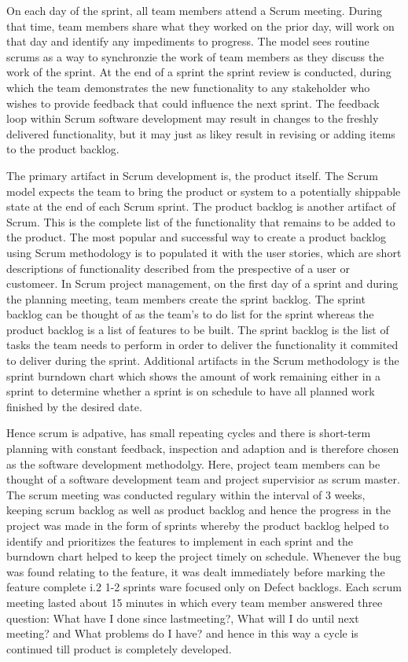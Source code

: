 On each day of the sprint, all team members attend a Scrum meeting. During that time, team members share what they worked on the prior day, will work on that day and identify any impediments to progress. The model sees routine scrums as a way to synchronzie the work of team members as they discuss the work of the sprint. At the end of a sprint the sprint review is conducted, during which the team demonstrates the new functionality to any stakeholder who wishes to provide feedback that could influence the next sprint. The feedback loop within Scrum software development may result in changes to the freshly delivered functionality, but it may just as likey result in revising or adding items to the product backlog.

The primary artifact in Scrum development is, the product itself. The Scrum model expects the team to bring the product or system to a potentially shippable state at the end of each Scrum sprint. The product backlog is another artifact of Scrum. This is the complete list of the functionality that remains to be added to the product. The most popular and successful way to create a product backlog using Scrum methodology is to populated it with the user stories, which are short descriptions of functionality described from the prespective of a user or customeer. In Scrum project management, on the first day of a sprint and during the planning meeting, team members create the sprint backlog. The sprint backlog can be thought of as the team's to do list for the sprint whereas the product backlog is a list of features to be built. The sprint backlog is the list of tasks the team needs to perform in order to deliver the functionality it commited to deliver during the sprint. Additional artifacts in the Scrum methodology is the sprint burndown chart which shows the amount of work remaining either in a sprint to determine whether a sprint is on schedule to have all planned work finished by the desired date.

Hence scrum is adpative, has small repeating cycles and there is short-term planning with constant feedback, inspection and adaption and is therefore chosen as the software development methodolgy. Here, project team members can be thought of a software development team and project supervisior as scrum master. The scrum meeting was conducted regulary within the interval of 3 weeks, keeping scrum backlog as well as product backlog and hence the progress in the project was made in the form of sprints whereby the product backlog helped to identify and prioritizes the features to implement in each sprint and the burndown chart helped to keep the project timely on schedule. Whenever the bug was found relating to the feature, it was dealt immediately before marking the feature complete i.2 1-2 sprints ware focused only on Defect backlogs. Each scrum meeting lasted about 15 minutes in which every team member answered three question: What have I done since lastmeeting?, What will I do until next meeting? and What problems do I have? and hence in this way a cycle is continued till product is completely developed.

